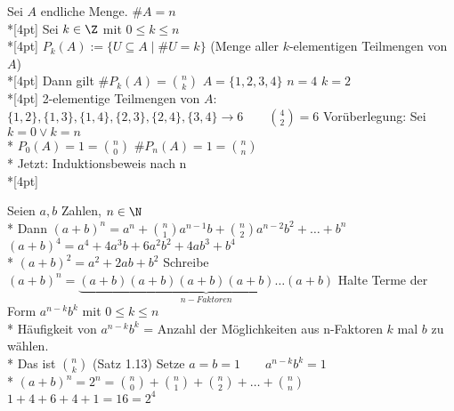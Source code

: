 Sei $A$ endliche Menge. $\#A=n$\\*[4pt]
Sei $k\in\Z$ mit $0\leq k\leq n$\\*[4pt]
$P_k(A):=\{U\subseteq A\mid \#U=k\}$ (Menge aller $k$-elementigen Teilmengen von $A$)\\*[4pt]
Dann gilt $\#P_k(A)=\binom{n}{k}$
\bsp
$A=\{1,2,3,4\}$ $n=4$ $k=2$\\*[4pt]
2-elementige Teilmengen von $A$:
$\{1,2\}, \{1,3\}, \{1,4\}, \{2,3\}, \{2,4\}, \{3,4\} \to 6\qquad \binom{4}{2}=6$ \ok
%
\bew
Vorüberlegung: Sei $k=0 \vee k=n$\\*
$P_0(A)=1=\binom{n}{0}$ $\#P_n(A)=1=\binom{n}{n}$\ok\\*
Jetzt: Induktionsbeweis nach n\\*[4pt]

Seien $a,b$ Zahlen, $n\in\N$\\*
Dann $(a+b)^n=a^n+\binom{n}{1} a^{n-1} b+\binom{n}{2}a^{n-2}b^2+…+b^n$
%
\bsp
$(a+b)^4=a^4+4a^3b+6a^2b^2+4ab^3+b^4$\\*
$(a+b)^2=a^2+2ab+b^2$
%
\bew
Schreibe $(a+b)^n=\underbrace{(a+b)(a+b)(a+b)(a+b)…(a+b)}_{n-Faktoren}$
%
Halte Terme der Form $a^{n-k}b^k$ mit $0\leq k\leq n$\\*
Häufigkeit von $a^{n-k}b^k$ = Anzahl der Möglichkeiten aus n-Faktoren $k$ mal $b$ zu wählen.\\*
Das ist $\binom{n}{k}$ (Satz 1.13)
%
Setze $a=b=1\qquad a^{n-k}b^k=1$\\*
$(a+b)^n=2^n=\binom{n}{0}+\binom{n}{1}+\binom{n}{2}+…+\binom{n}{n}$
%
\bsp
$1+4+6+4+1=16=2^4$

